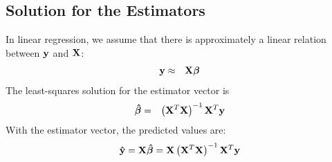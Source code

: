 \documentclass[11pt]{article}
\theoremstyle{remark}
\begin{document}
\subsection{Solution for the Estimators}
In linear regression, we assume that there is approximately a linear relation between $\bold{y}$ and $\bold{X}$:
\begin{eqnarray}
\bold{y} &\approx& \bold{X}\boldsymbol{\beta}
\end{eqnarray}
The least-squares solution for the estimator vector is
\begin{eqnarray}
\boldsymbol{\hat{\beta}} &=& \left(\bold{X}^T\bold{X}\right)^{-1}\bold{X}^T\bold{y}
\label{EstimatorSolution}
\end{eqnarray}
With the estimator vector, the predicted values are:
\begin{equation}
\bold{\hat{y}} = \bold{X}\boldsymbol{\hat{\beta}} = \bold{X}\left(\bold{X}^T\bold{X}\right)^{-1}\bold{X}^T\bold{y}
\end{equation}
\end{document}
